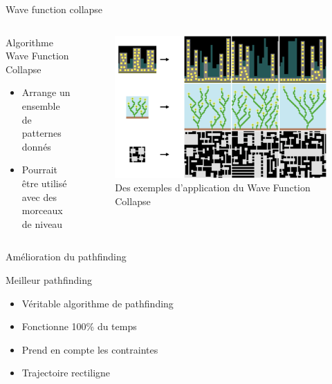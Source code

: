 \documentclass{beamer}
\begin{document}
{\begin{frame}{Wave function collapse}
    \begin{columns}
        \begin{block}{Algorithme Wave Function Collapse}
            \begin{itemize}
                \item[\bullet] Arrange un ensemble de patternes donnés
                \item[\bullet] Pourrait être utilisé avec des morceaux de niveau
            \end{itemize}
        \end{block}
        \begin{figure}
            \centering
            \includegraphics[width=1.0\textwidth]{images/wfc-examples}
            \caption{Des exemples d'application du Wave Function Collapse}
        \end{figure}
    \end{columns}
\end{frame}

\begin{frame}{Amélioration du pathfinding}
    \begin{block}{Meilleur pathfinding}
        \begin{itemize}
            \item[\bullet] Véritable algorithme de pathfinding
            \item[\bullet] Fonctionne 100\% du temps
            \item[\bullet] Prend en compte les contraintes
            \item[\bullet] Trajectoire rectiligne
        \end{itemize}
    \end{block}
\end{frame}

}
\end{document}
